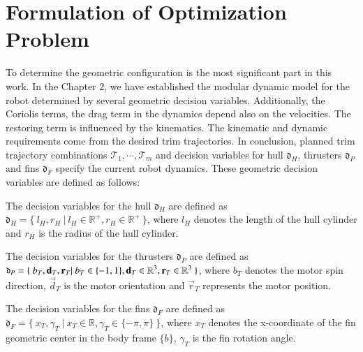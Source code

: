 \chapter{Formulation of Optimization Problem}
To determine the geometric configuration is the most significant part in this work. In the Chapter 2, we have established the modular dynamic model for the robot determined by several geometric decision variables. Additionally, the Coriolis terms, the drag term in the dynamics depend also on the velocities. The restoring term is influenced by the kinematics. The kinematic and dynamic requirements come from the desired trim trajectories.  In conclusion, planned trim trajectory combinations $\mathcal{T}_{1},\cdots,\mathcal{T}_{m}$ and decision variables for hull $\mathfrak{d}_{H}$, thrusters $\mathfrak{d}_{P}$ and fins $\mathfrak{d}_{F}$ specify the current robot dynamics. These geometric decision variables are defined as follows:
\begin{definition}
The decision variables for the hull $\mathfrak{d}_{H}$ are defined as $\mathfrak{d}_{H}=\lbrace~l_{H}, r_{H}~|~l_{H}\in \mathbb{R}^{+}, r_{H} \in \mathbb{R}^{+}~\rbrace$, where $l_{H}$ denotes the length of the hull cylinder and $r_{H}$ is the radius of the hull cylinder.
\end{definition}
\begin{definition}
The decision variables for the thrusters $\mathfrak{d}_{P}$ are defined as $\mathfrak{d}_{P}=\lbrace~b_{T}, \vec{d}_{T}, \vec{r}_{T}~\\|~b_{T}\in \lbrace -1, 1 \rbrace, \vec{d}_{T} \in \mathbb{R}^{3}, \vec{r}_{T} \in \mathbb{R}^{3}~\rbrace$, where $b_{T}$ denotes the motor spin direction, $\vec{d}_{T}$ is the motor orientation and $\vec{r}_{T}$ represents the motor position.
\end{definition}
\begin{definition}
The decision variables for the fins $\mathfrak{d}_{F}$ are defined as $\mathfrak{d}_{F}=\lbrace~x_{T}, \gamma_{T}~|~x_{T}\in \mathbb{R}, \gamma_{T} \in \lbrace -\pi,\pi \rbrace~\rbrace$, where $x_{T}$ denotes the x-coordinate of the fin geometric center in the body frame $\lbrace b \rbrace$, $\gamma_{T}$ is the fin rotation angle.
\end{definition}

